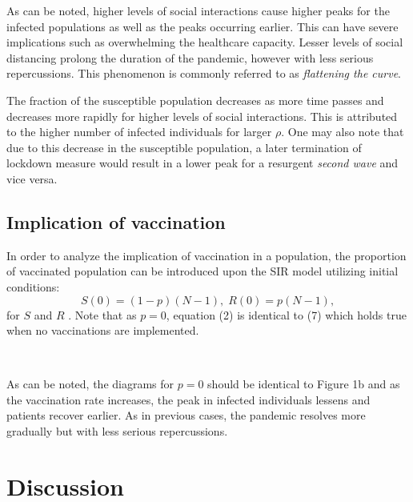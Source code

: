 \documentclass[12pt]{article}
\begin{document}
\noindent As can be noted, higher levels of social interactions 
cause higher peaks for the infected populations as well as the 
peaks occurring earlier. This can have severe implications 
such as overwhelming the healthcare capacity. 
Lesser levels of social distancing prolong the 
duration of the pandemic, however with less serious repercussions. 
This phenomenon is commonly referred to as \textit{flattening the curve}.

The fraction of the susceptible population decreases as more time 
passes and decreases more rapidly for higher levels of social interactions. 
\newpage 
\noindent This is attributed to the higher number of infected 
individuals for larger $\rho$. One may also note that due to 
this decrease in the susceptible population, a later 
termination of lockdown measure would result in a lower 
peak for a resurgent \textit{second wave} and vice versa.

\subsection{Implication of vaccination}
In order to analyze the implication of vaccination in a 
population, the proportion of vaccinated population can 
be introduced upon the SIR model utilizing initial conditions:
\begin{equation}
S(0) = (1-p)(N-1), \; R(0) = p(N-1),  
\end{equation}
for $S$ and $R$ \cite{ashraf}. 
Note that as $p = 0$, equation (2) is 
identical to (7) which holds true 
when no vaccinations are implemented. 

\begin{figure*}[ht!]
\begin{center}
   \\
   \caption{\label{workflow} (a) 40 \% vaccination rate (b) 50 \% vaccination rate}
\end{center}
\end{figure*}
\noindent As can be noted, the diagrams for $p = 0$ should be 
identical to Figure 1b and as the vaccination rate increases, 
the peak in infected individuals lessens and patients recover 
earlier. As in previous cases, the pandemic resolves 
more gradually but with less serious repercussions.

\section{Discussion}
\end{document}
